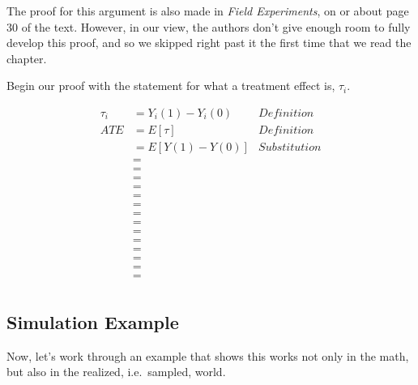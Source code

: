 \documentclass[
]{article}
\begin{document}
The proof for this argument is also made in \emph{Field Experiments}, on or about page 30 of the text. However, in our view, the authors don't give enough room to fully develop this proof, and so we skipped right past it the first time that we read the chapter.

Begin our proof with the statement for what a treatment effect is, \(\tau_{i}\).

\[
  \begin{aligned} 
    \tau_{i}    &= Y_{i}(1) - Y_{i}(0)    & Definition   \\ 
    ATE         &= E[\tau]                & Definition   \\
                &= E[Y(1) - Y(0)]         & Substitution \\
                &=                                       \\
                &=                                       \\
                &=                                       \\
                &=                                       \\
                &=                                       \\
                &=                                       \\
                &=                                       \\
                &=                                       \\
                &=                                       \\
                &=                                       \\
                &=                                       \\
                &=                                       \\
                &=                                       \\
                &=                                       \\
  \end{aligned}
\]

\hypertarget{simulation-example}{%
\subsection{Simulation Example}\label{simulation-example}}

Now, let's work through an example that shows this works not only in the math, but also in the realized, i.e.~sampled, world.
\end{document}
